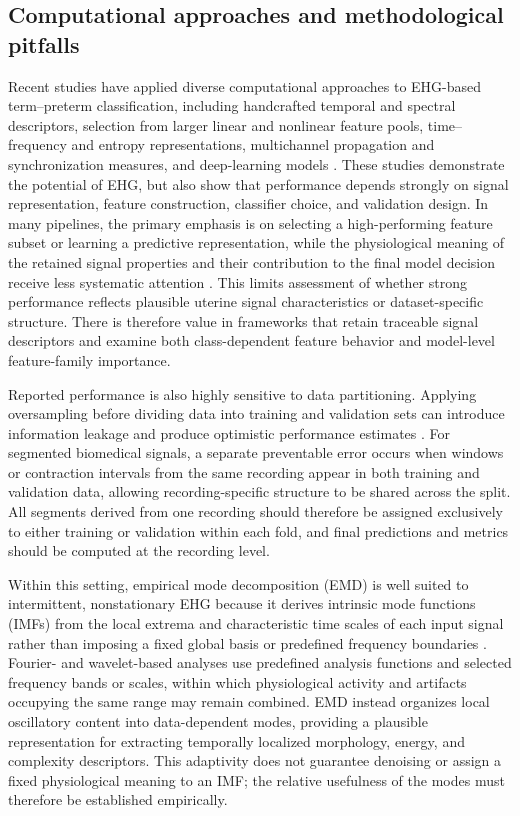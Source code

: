 \documentclass[10pt,letterpaper]{article}
\begin{document}
\subsection*{Computational approaches and methodological pitfalls}
Recent studies have applied diverse computational approaches to EHG-based term–preterm classification, including handcrafted temporal and spectral descriptors, selection from larger linear and nonlinear feature pools, time–frequency and entropy representations, multichannel propagation and synchronization measures, and deep-learning models \cite{FeleZorz2008, Jager2018_TPEHGT, Fergus2013_EHGML, Alamedine2013_EHGFeatureSelection, RomeroMorales2023, Goldsztejn2023_EHGDeepLearning, Fischer2023_EHGDeepLearning}. These studies demonstrate the potential of EHG, but also show that performance depends strongly on signal representation, feature construction, classifier choice, and validation design. In many pipelines, the primary emphasis is on selecting a high-performing feature subset or learning a predictive representation, while the physiological meaning of the retained signal properties and their contribution to the final model decision receive less systematic attention \cite{Pirnar2024}. This limits assessment of whether strong performance reflects plausible uterine signal characteristics or dataset-specific structure. There is therefore value in frameworks that retain traceable signal descriptors and examine both class-dependent feature behavior and model-level feature-family importance.

Reported performance is also highly sensitive to data partitioning. Applying oversampling before dividing data into training and validation sets can introduce information leakage and produce optimistic performance estimates \cite{Vandewiele2021}. For segmented biomedical signals, a separate preventable error occurs when windows or contraction intervals from the same recording appear in both training and validation data, allowing recording-specific structure to be shared across the split. All segments derived from one recording should therefore be assigned exclusively to either training or validation within each fold, and final predictions and metrics should be computed at the recording level.

Within this setting, empirical mode decomposition (EMD) is well suited to intermittent, nonstationary EHG because it derives intrinsic mode functions (IMFs) from the local extrema and characteristic time scales of each input signal rather than imposing a fixed global basis or predefined frequency boundaries \cite{Huang1998_EMD}. Fourier- and wavelet-based analyses use predefined analysis functions and selected frequency bands or scales, within which physiological activity and artifacts occupying the same range may remain combined. EMD instead organizes local oscillatory content into data-dependent modes, providing a plausible representation for extracting temporally localized morphology, energy, and complexity descriptors. This adaptivity does not guarantee denoising or assign a fixed physiological meaning to an IMF; the relative usefulness of the modes must therefore be established empirically.
\end{document}
